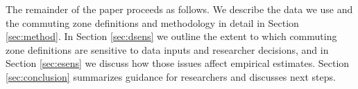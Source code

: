 The remainder of the paper proceeds as follows. We describe the data we use and the commuting zone definitions and methodology in detail in Section \ref{sec:method}. In Section \ref{sec:dsens} we outline the extent to which commuting zone definitions are sensitive to data inputs and researcher decisions, and in Section \ref{sec:esens} we discuss how those issues affect empirical estimates. Section \ref{sec:conclusion} summarizes guidance for researchers and discusses next steps. 


